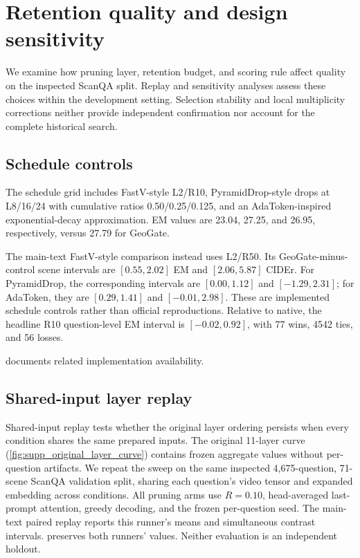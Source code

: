 \section{Retention quality and design sensitivity}
\label{sec:supp_quality}
We examine how pruning layer, retention budget, and scoring rule affect quality on the inspected ScanQA split. Replay and sensitivity analyses assess these choices within the development setting. Selection stability and local multiplicity corrections neither provide independent confirmation nor account for the complete historical search.


\subsection{Schedule controls}
The schedule grid includes FastV-style L2/R10, PyramidDrop-style drops at L8/16/24 with cumulative ratios 0.50/0.25/0.125, and an AdaToken-inspired exponential-decay approximation. EM values are 23.04, 27.25, and 26.95, respectively, versus 27.79 for GeoGate.

The main-text FastV-style comparison instead uses L2/R50. Its GeoGate-minus-control scene intervals are $[0.55,2.02]$ EM and $[2.06,5.87]$ CIDEr. For PyramidDrop, the corresponding intervals are $[0.00,1.12]$ and $[-1.29,2.31]$; for AdaToken, they are $[0.29,1.41]$ and $[-0.01,2.98]$. These are implemented schedule controls rather than official reproductions. Relative to native, the headline R10 question-level EM interval is $[-0.02,0.92]$, with 77 wins, 4542 ties, and 56 losses.

 documents related implementation availability.

\subsection{Shared-input layer replay}
\label{sec:supp_layer_replay}

Shared-input replay tests whether the original layer ordering persists when every condition shares the same prepared inputs. The original 11-layer curve (\cref{fig:supp_original_layer_curve}) contains frozen aggregate values without per-question artifacts. We repeat the sweep on the same inspected 4,675-question, 71-scene ScanQA validation split, sharing each question's video tensor and expanded embedding across conditions. All pruning arms use $R=0.10$, head-averaged last-prompt attention, greedy decoding, and the frozen per-question seed. The main-text paired replay reports this runner's means and simultaneous contrast intervals.  preserves both runners' values. Neither evaluation is an independent holdout.

